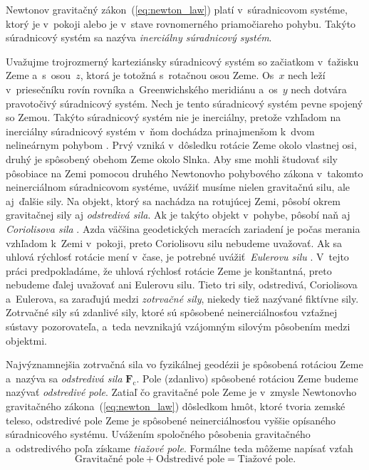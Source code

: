 \documentclass[a4paper, 12pt]{book}
\newcommand{\cidx}{\mathrm c}
\let\vec\mathbf
\begin{document}
Newtonov gravitačný zákon~(\ref{eq:newton_law}) platí v~súradnicovom systéme,
ktorý je v~pokoji alebo je v~stave rovnomerného priamočiareho pohybu.  Takýto
súradnicový systém sa nazýva \emph{inerciálny súradnicový systém}.

Uvažujme trojrozmerný karteziánsky súradnicový systém so začiatkom v~ťažisku 
Zeme a~s~osou~$z$, ktorá je totožná s~rotačnou osou Zeme.  Os~$x$ nech leží 
v~priesečníku rovín rovníka a~Greenwichského meridiánu a~os~$y$ nech dotvára 
pravotočivý súradnicový systém.  Nech je tento súradnicový systém pevne spojený 
so Zemou.  Takýto súradnicový systém nie je inerciálny, pretože vzhľadom na 
inerciálny súradnicový systém v~ňom dochádza prinajmenšom k~dvom nelineárnym 
pohybom \parencite{SansoGeoidDetermination}.  Prvý vzniká v~dôsledku rotácie 
Zeme okolo vlastnej osi, druhý je spôsobený obehom Zeme okolo Slnka.  Aby sme 
mohli študovať sily pôsobiace na Zemi pomocou druhého Newtonovho pohybového 
zákona v~takomto neinerciálnom súradnicovom systéme, uvážiť musíme nielen 
gravitačnú silu, ale aj~ďalšie sily.  Na objekt, ktorý sa nachádza na rotujúcej 
Zemi, pôsobí okrem gravitačnej sily aj \emph{odstredivá sila}.  Ak je takýto 
objekt v~pohybe, pôsobí naň aj \emph{Coriolisova sila} 
\parencite{Torge1989,Jekeli2000,MoritzPhysicalGeodesy,SansoGeoidDetermination}.  
Azda väčšina geodetických meracích zariadení je počas merania vzhľadom k~Zemi 
v~pokoji, preto Coriolisovu silu nebudeme uvažovať.  Ak sa uhlová rýchlosť 
rotácie mení v~čase, je potrebné uvážiť~\emph{Eulerovu silu} 
\parencite{Torge1989,SansoGeoidDetermination}.  V~tejto práci predpokladáme, že 
uhlová rýchlosť rotácie Zeme je konštantná, preto nebudeme ďalej uvažovať ani 
Eulerovu silu.  Tieto tri sily, odstredivá, Coriolisova a~Eulerova, sa zaraďujú 
medzi \emph{zotrvačné sily}, niekedy tiež nazývané fiktívne sily.  Zotrvačné 
sily sú zdanlivé sily, ktoré sú spôsobené neinerciálnosťou vzťažnej sústavy 
pozorovateľa, a~teda nevznikajú vzájomným silovým pôsobením medzi objektmi.

Najvýznamnejšia zotrvačná sila vo fyzikálnej geodézii je spôsobená rotáciou 
Zeme a~nazýva sa \emph{odstredivá sila}
$\vec F_\cidx$.  Pole (zdanlivo) spôsobené rotáciou Zeme budeme nazývať 
\emph{odstredivé pole}.  Zatiaľ čo gravitačné pole Zeme je v~zmysle Newtonovho 
gravitačného zákona~(\ref{eq:newton_law}) dôsledkom hmôt, ktoré tvoria zemské 
teleso, odstredivé pole Zeme je spôsobené neinerciálnosťou vyššie opísaného 
súradnicového systému.  Uvážením spoločného pôsobenia gravitačného 
a~odstredivého poľa získame \emph{tiažové pole}.  Formálne teda môžeme napísať 
vzťah
%
\begin{equation*}
\textrm{Gravitačné pole} + \textrm{Odstredivé pole} = \textrm{Tiažové pole}{.}
\end{equation*}
\end{document}
